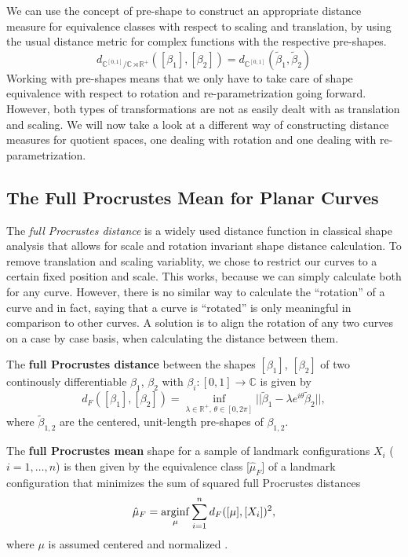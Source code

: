 \noindent We can use the concept of pre-shape to construct an appropriate distance
measure for equivalence classes with respect to scaling and translation, by
using the usual distance metric for complex functions with the respective
pre-shapes.
$$d_{\mathbb{C}^{[0,1]} \big/ \mathbb{C} \rtimes
\mathbb{R}^+}([\beta_1], [\beta_2]) = d_{\mathbb{C}^{[0,1]}}(\tilde\beta_1,
\tilde\beta_2)$$
\noindent Working with pre-shapes means that we only have to take care of shape
equivalence with respect to rotation and re-parametrization going forward.
However, both types of transformations are not as easily dealt with as
translation and scaling.
We will now take a look at a different way of constructing distance measures
for quotient spaces, one dealing with rotation and one dealing with
re-parametrization.


\subsection{The Full Procrustes Mean for Planar Curves}
\label{theo:proc}

The \textit{full Procrustes distance} is a widely used distance function in
classical shape analysis that allows for scale and rotation invariant shape
distance calculation.
To remove translation and scaling variablity, we chose to restrict our curves
to a certain fixed position and scale.
This works, because we can simply calculate both for any curve.
However, there is no similar way to calculate the \enquote{rotation} of a
curve and in fact, saying that a curve is \enquote{rotated} is only meaningful in
comparison to other curves. 
A solution is to align the rotation of any two curves on a case by case basis,
when calculating the distance between them.
\begin{definition}
  The \textbf{full Procrustes distance} between the shapes $[\beta_1]$,
  $[\beta_2]$ of two continously differentiable $\beta_1$, $\beta_2$ with
  $\beta_i : [0,1] \rightarrow \mathbb{C}$ is given by 
    $$d_F([\beta_1], [\beta_2]) = \inf_{\lambda \in \mathbb{R}^+,\, \theta \in
    [0,2\pi]} ||\tilde{\beta}_1 - \lambda e^{i\theta} \tilde{\beta}_2||, $$
    where $\tilde\beta_{1,2}$ are the centered, unit-length pre-shapes of
    $\beta_{1,2}$.
\end{definition}
\begin{definition}
    The \textbf{full Procrustes mean} shape for a sample of landmark
    configurations $X_i$ ($i = 1,\dots,n$) is then given by the equivalence
    class [$\hat\mu_F$] of a landmark configuration that minimizes the sum of
    squared full Procrustes distances
    $$\hat{\mu}_F = \operatorname*{arginf}_{\mu} \sum_{i=1}^n d_F([\mu], [X_i])^2, $$
    where $\mu$ is assumed centered and normalized
    \parencites[see][71,114]{DrydenMardia2016}.
\end{definition}

